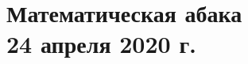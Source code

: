 \documentclass[a4paper,12pt]{article} %
\begin{document}
	\newpage
	\section{Математическая абака \\24 апреля 2020 г.}
	
	\subsection{}{
	}
	
\end{document}
